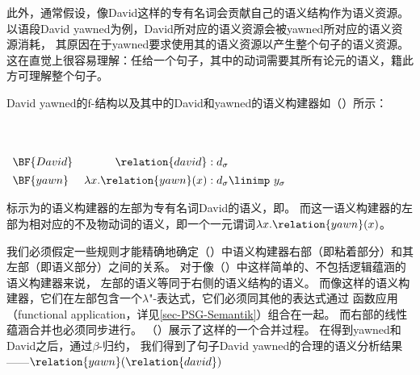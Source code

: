 此外，通常假设，像David这样的专有名词会贡献自己的语义结构作为语义资源。
以语段David yawned为例，David所对应的语义资源会被yawned所对应的语义资源消耗，
其原因在于yawned要求使用其\lfgsubj 的语义资源以产生整个句子的语义资源。
这在直觉上很容易理解：任给一个句子，其中的动词需要其所有论元的语义，籍此方可理解整个句子。
  
David yawned的f-结构以及其中的David和yawned的语义构建器如（）所示：

\eanoraggedright
 ~\\[-\baselineskip]
~\\[1em]
{$\begin{array}[t]{lr@{\;:\;}l}
\BF{David}&{\relation{david}}&{d_\sigma}\\*[1ex]
\BF{yawn}&{\lambda x. \relation{yawn}(x)}&{d_\sigma \linimp\ y_\sigma}
\end{array}$}
\z

\noindent 
标示为的语义构建器的左部为专有名词David的语义，即。
而\linebreak{}这一语义构建器的左部为相对应的不及物动词的语义，即一个一元谓词$\lambda x. \relation{yawn}(x)$。

我们必须假定一些规则才能精确地确定（）中语义构建器右部（即粘着部分）和其左部（即语义部分）之间的关系。
对于像（）中这样简单的、不包括逻辑蕴涵的语义构建器来说，
左部的语义等同于右侧的语义结构的语义。
而像这样的语义构建器，它们在左部包含一个$\lambda$"-表达式，它们必须同其他的表达式通过
函数应用（functional application，详见\ref{sec-PSG-Semantik}）组合在一起。
而右部的线性蕴涵合并也必须同步进行。
（）展示了这样的一个合并过程。
在得到yawned和David之后，通过$\beta$-归约，
我们得到了句子David yawned的合理的语义分析结果——$\relation{yawn}(\relation{david})$ 

